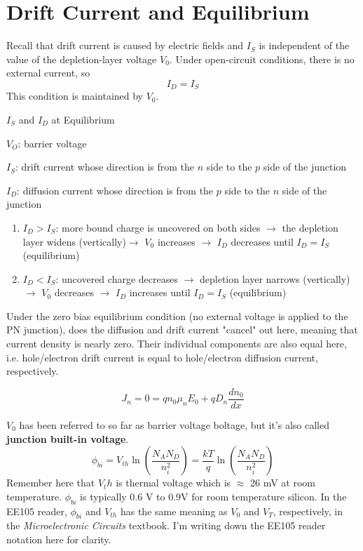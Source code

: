 \section{Drift Current and Equilibrium}
Recall that drift current is caused by electric fields and $I_S$ is independent of the value of the depletion-layer voltage $V_0$. Under open-circuit conditions, there is no external current, so 
    \[I_D = I_S\]
This condition is maintained by $V_0$.
\begin{Analysis}{$I_S$ and $I_D$ at Equilibrium}{}
    \begin{gline}
        \item $V_O$: barrier voltage
        \item $I_S$: drift current whose direction is from the $n$ side to the $p$ side of the junction
        \item $I_D$: diffusion current whose direction is from the $p$ side to the $n$ side of the junction
    \end{gline}
    \begin{enumerate}
        \item \textbf{$I_D > I_S$}: more bound charge is uncovered on both sides $\rightarrow$ the depletion layer widens (vertically)$\rightarrow$ $V_0$ increases $\rightarrow$ $I_D$ decreases until $I_D = I_S$ (equilibrium)
        \item \textbf{$I_D < I_S$}: uncovered charge decreases $\rightarrow$ depletion layer narrows (vertically) $\rightarrow$ $V_0$ decreases $\rightarrow$ $I_D$ increases until $I_D = I_S$ (equilibrium)
    \end{enumerate}
\end{Analysis}

Under the zero bias equilibrium condition (no external voltage is applied to the PN junction), does the diffusion and drift current "cancel" out here, meaning that current density is nearly zero. Their individual components are also equal here, i.e. hole/electron drift current is equal to hole/electron diffusion current, respectively.

    \[J_n = 0 = qn_0 \mu_n E_0 + q D_n \frac{dn_0}{dx}\]

$V_0$ has been referred to so far as barrier voltage boltage, but it's also called \textbf{junction built-in voltage}.
    \[\phi_{bi} = V_{th} \ln \left(\frac{N_A N_D}{n_i^2}\right) = \frac{kT}{q} \ln \left(\frac{N_A N_D}{n_i^2}\right)\]
Remember here that $V_th$ is thermal voltage which is $\approx$ 26 mV at room temperature. $\phi_{bi}$ is typically 0.6 V to 0.9V for room temperature silicon. In the EE105 reader, $\phi_{bi}$ and $V_{th}$ has the same meaning as $V_0$ and $V_T$, respectively, in the \textit{Microelectronic Circuits} textbook. I'm writing down the EE105 reader notation here for clarity.

